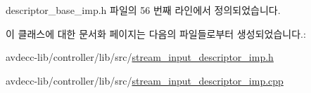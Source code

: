 descriptor\+\_\+base\+\_\+imp.\+h 파일의 56 번째 라인에서 정의되었습니다.



이 클래스에 대한 문서화 페이지는 다음의 파일들로부터 생성되었습니다.\+:\begin{DoxyCompactItemize}
\item 
avdecc-\/lib/controller/lib/src/\hyperlink{stream__input__descriptor__imp_8h}{stream\+\_\+input\+\_\+descriptor\+\_\+imp.\+h}\item 
avdecc-\/lib/controller/lib/src/\hyperlink{stream__input__descriptor__imp_8cpp}{stream\+\_\+input\+\_\+descriptor\+\_\+imp.\+cpp}\end{DoxyCompactItemize}
